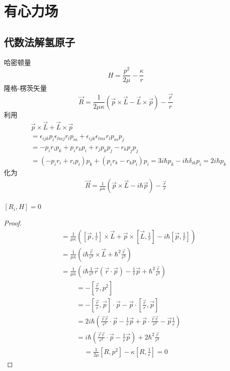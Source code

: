 \section{有心力场}
\subsection{代数法解氢原子}
哈密顿量
$$
H = \frac{p^2}{2\mu} - \frac{\kappa}{r}
$$
隆格-楞茨矢量
$$
\vec R = \frac{1}{2\mu\kappa}\left(\vec p\times \vec L - \vec L \times \vec p\right) - \frac{\vec r}{r}
$$
利用
\begin{align*}
&\vec p\times \vec L + \vec L \times \vec p \\
&= \epsilon_{ijk}p_i \epsilon_{lmj}r_l p_m + \epsilon_{ijk}\epsilon_{lmi}r_l p_m p_j\\
&= -p_i r_i p_k + p_i r_k p_i + r_j p_k p_j - r_k p_j p_j\\
&= (-p_i r_i+r_i p_i) p_k + (p_i r_k - r_k p_i)p_i = 3i\hbar p_k - i \hbar \delta_{ik}p_i = 2i\hbar p_k
\end{align*}
化为
\begin{align*}
\vec R = \frac{1}{\mu \kappa}(\vec p \times \vec L - i\hbar \vec p) - \frac{\vec r}{r}
\end{align*}
\begin{theorem}
$[R_i, H] = 0$
\end{theorem}
\begin{proof}
\begin{align*}
[R,\frac{1}{r}] &=  \frac{1}{\mu \kappa}([\vec p, \frac{1}{r}] \times \vec L + \vec p \times [\vec L, \frac{1}{r}] - i\hbar [\vec p, \frac{1}{r}])\\
&=\frac{1}{\mu\kappa}\left(i\hbar \frac{\vec r}{r^3}\times \vec L + \hbar^2 \frac{\vec r}{r^3}\right)\\
&= \frac{1}{\mu\kappa}\left(i\hbar \frac{1}{r^3} \vec r(\vec r\cdot \vec p) - \frac{1}{r}\vec p + \hbar^2 \frac{\vec r}{r^3}\right)
\end{align*}
\begin{align*}
[R, p^2] &= -[\frac{\vec r}{r}, p^2]\\
&= - [\frac{\vec r}{r}, \vec p] \cdot \vec p - \vec p \cdot[\frac{\vec r}{r}, \vec p]\\
&= 2 i\hbar\left(\frac{\vec r \vec r}{r^3} \cdot \vec p - \frac{1}{r}\vec p + \vec p \cdot \frac{\vec r \vec r}{r^3}  - \vec p \frac{1}{r}\right)\\
&= i\hbar\left(\frac{\vec r \vec r}{r^3} \cdot \vec p - \frac{1}{r}\vec p\right) + 2\hbar^2 \frac{\vec r}{r^3}
\end{align*}
\begin{align*}
[R,H] = \frac{1}{2\mu}[R,p^2] -\kappa [R, \frac{1}{r}] = 0
\end{align*}
\end{proof}
